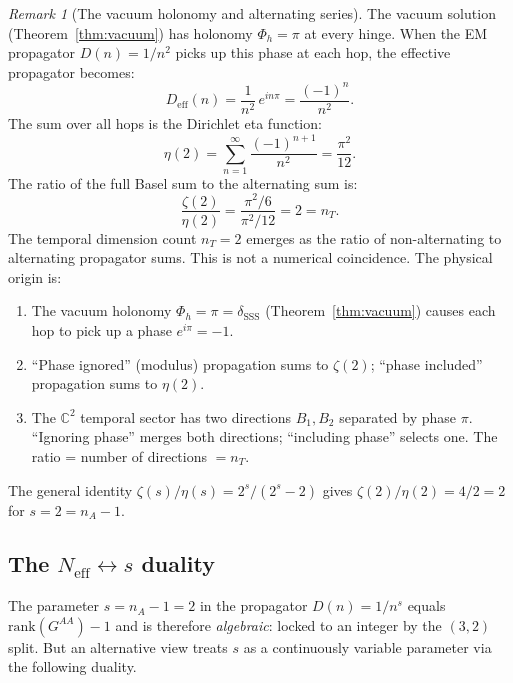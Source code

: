 \documentclass[12pt]{article}
\theoremstyle{remark}
\newtheorem{remark}[theorem]{Remark}
\theoremstyle{definition}
\newcommand{\CC}{\mathbb{C}}
\begin{document}
\begin{remark}[The vacuum holonomy and alternating series]
\label{rem:zeta_eta}
The vacuum solution (Theorem~\ref{thm:vacuum}) has holonomy $\Phi_h = \pi$ at every hinge.  When the EM propagator $D(n) = 1/n^2$ picks up this phase at each hop, the effective propagator becomes:
\begin{equation}
D_\text{eff}(n) = \frac{1}{n^2}\,e^{in\pi} = \frac{(-1)^n}{n^2}.
\end{equation}
The sum over all hops is the Dirichlet eta function:
\begin{equation}
\eta(2) = \sum_{n=1}^{\infty}\frac{(-1)^{n+1}}{n^2} = \frac{\pi^2}{12}.
\end{equation}
The ratio of the full Basel sum to the alternating sum is:
\begin{equation}
\boxed{\frac{\zeta(2)}{\eta(2)} = \frac{\pi^2/6}{\pi^2/12} = 2 = n_T.}
\end{equation}
The temporal dimension count $n_T = 2$ emerges as the ratio of non-alternating to alternating propagator sums.  This is not a numerical coincidence.  The physical origin is:

\begin{enumerate}
\item The vacuum holonomy $\Phi_h = \pi = \delta_{\mathrm{SSS}}$ (Theorem~\ref{thm:vacuum}) causes each hop to pick up a phase $e^{i\pi} = -1$.
\item ``Phase ignored'' (modulus) propagation sums to $\zeta(2)$; ``phase included'' propagation sums to $\eta(2)$.
\item The $\CC^2$ temporal sector has two directions $B_1, B_2$ separated by phase $\pi$.  ``Ignoring phase'' merges both directions; ``including phase'' selects one.  The ratio = number of directions $= n_T$.
\end{enumerate}

The general identity $\zeta(s)/\eta(s) = 2^s/(2^s - 2)$ gives $\zeta(2)/\eta(2) = 4/2 = 2$ for $s = 2 = n_A - 1$.
\end{remark}

\subsection{The $N_\text{eff} \leftrightarrow s$ duality}
\label{sec:Neff_s_duality}

The parameter $s = n_A - 1 = 2$ in the propagator $D(n) = 1/n^s$ equals $\mathrm{rank}(G^{AA}) - 1$ and is therefore \emph{algebraic}: locked to an integer by the $(3,2)$ split.  But an alternative view treats $s$ as a continuously variable parameter via the following duality.
\end{document}
